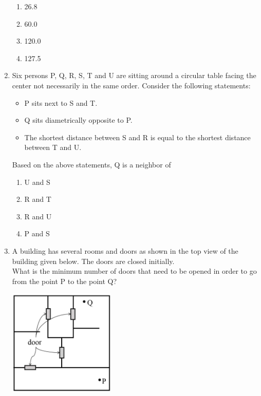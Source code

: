 \documentclass[journal,12pt,onecolumn]{exam}
\theoremstyle{remark}
\begin{document}
\begin{enumerate}
    \begin{enumerate}
        \item 26.8
        \item 60.0
        \item 120.0
        \item 127.5
    \end{enumerate}
    \item Six persons P, Q, R, S, T and U are sitting around a circular table facing the center not necessarily in the same order. Consider the following statements:
    \begin{itemize}
        \item P sits next to S and T.
        \item Q sits diametrically opposite to P.
        \item The shortest distance between S and R is equal to the shortest distance between T and U.
    \end{itemize}
    Based on the above statements, Q is a neighbor of

    \begin{enumerate}
        \item U and S
        \item R and T
        \item R and U
        \item P and S
    \end{enumerate}
    \item A building has several rooms and doors as shown in the top view of the building given below. The doors are closed initially.\\

    What is the minimum number of doors that need to be opened in order to go from the point P to the point Q?

    \begin{center}
        \includegraphics[width=0.4\textwidth]{figs/question number 4 .png} %
    \end{center}


\end{enumerate}
\end{document}
